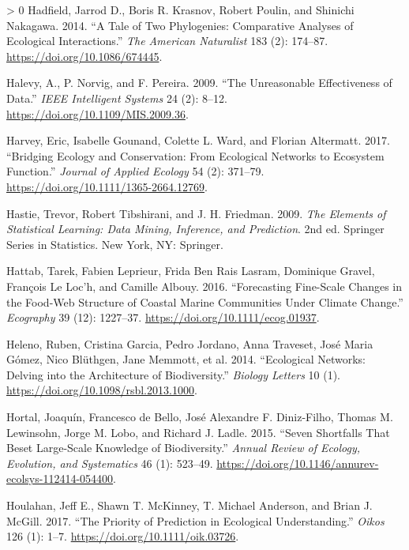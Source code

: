 \documentclass[11pt]{article}
\newlength{\cslhangindent}
\newenvironment{CSLReferences}[3] %
 {%
  \setlength{\parindent}{0pt}
  \ifodd #1 \everypar{\setlength{\hangindent}{\cslhangindent}}\ignorespaces\fi
  \ifnum #2 > 0
  \setlength{\parskip}{#2\baselineskip}
  \fi
 }%
 {}
\begin{document}
\begin{CSLReferences}{1}{0}
\leavevmode\hypertarget{ref-Hadfield2014TalTwo}{}%
Hadfield, Jarrod D., Boris R. Krasnov, Robert Poulin, and Shinichi
Nakagawa. 2014. {``A Tale of Two Phylogenies: Comparative Analyses of
Ecological Interactions.''} \emph{The American Naturalist} 183 (2):
174--87. \url{https://doi.org/10.1086/674445}.

\leavevmode\hypertarget{ref-Halevy2009UnrEff}{}%
Halevy, A., P. Norvig, and F. Pereira. 2009. {``The Unreasonable
Effectiveness of Data.''} \emph{IEEE Intelligent Systems} 24 (2): 8--12.
\url{https://doi.org/10.1109/MIS.2009.36}.

\leavevmode\hypertarget{ref-Harvey2017BriEco}{}%
Harvey, Eric, Isabelle Gounand, Colette L. Ward, and Florian Altermatt.
2017. {``Bridging Ecology and Conservation: From Ecological Networks to
Ecosystem Function.''} \emph{Journal of Applied Ecology} 54 (2):
371--79. \url{https://doi.org/10.1111/1365-2664.12769}.

\leavevmode\hypertarget{ref-Hastie2009EleSta}{}%
Hastie, Trevor, Robert Tibshirani, and J. H. Friedman. 2009. \emph{The
Elements of Statistical Learning: Data Mining, Inference, and
Prediction}. 2nd ed. Springer Series in Statistics. New York, NY:
Springer.

\leavevmode\hypertarget{ref-Hattab2016ForFin}{}%
Hattab, Tarek, Fabien Leprieur, Frida Ben Rais Lasram, Dominique Gravel,
François Le Loc'h, and Camille Albouy. 2016. {``Forecasting Fine-Scale
Changes in the Food-Web Structure of Coastal Marine Communities Under
Climate Change.''} \emph{Ecography} 39 (12): 1227--37.
\url{https://doi.org/10.1111/ecog.01937}.

\leavevmode\hypertarget{ref-Heleno2014EcoNet}{}%
Heleno, Ruben, Cristina Garcia, Pedro Jordano, Anna Traveset, José Maria
Gómez, Nico Blüthgen, Jane Memmott, et al. 2014. {``Ecological Networks:
Delving into the Architecture of Biodiversity.''} \emph{Biology Letters}
10 (1). \url{https://doi.org/10.1098/rsbl.2013.1000}.

\leavevmode\hypertarget{ref-Hortal2015SevSho}{}%
Hortal, Joaquín, Francesco de Bello, José Alexandre F. Diniz-Filho,
Thomas M. Lewinsohn, Jorge M. Lobo, and Richard J. Ladle. 2015. {``Seven
Shortfalls That Beset Large-Scale Knowledge of Biodiversity.''}
\emph{Annual Review of Ecology, Evolution, and Systematics} 46 (1):
523--49. \url{https://doi.org/10.1146/annurev-ecolsys-112414-054400}.

\leavevmode\hypertarget{ref-Houlahan2017PriPre}{}%
Houlahan, Jeff E., Shawn T. McKinney, T. Michael Anderson, and Brian J.
McGill. 2017. {``The Priority of Prediction in Ecological
Understanding.''} \emph{Oikos} 126 (1): 1--7.
\url{https://doi.org/10.1111/oik.03726}.


\end{CSLReferences}
\end{document}
